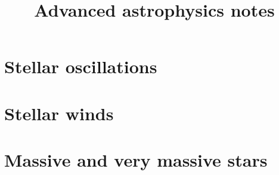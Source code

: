 \documentclass[11pt]{report}
\title{Advanced astrophysics notes}
\begin{document}
\maketitle
\tableofcontents

\chapter{Stellar oscillations}













\chapter{Stellar winds}



















\chapter{Massive and very massive stars}







\end{document}
